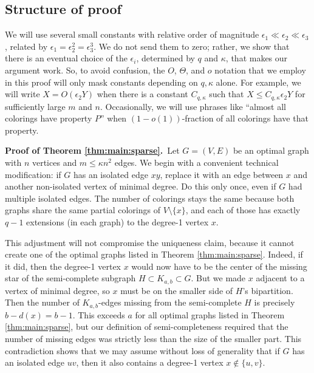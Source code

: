 \documentclass[11pt]{article}
\begin{document}
\subsection{Structure of proof}

We will use several small constants with relative order of magnitude
$\epsilon_1 \ll \epsilon_2 \ll \epsilon_3$, related by $\epsilon_1 =
\epsilon_2^2 = \epsilon_3^3$.  We do not send them to zero; rather, we
show that there is an eventual choice of the $\epsilon_i$, determined
by $q$ and $\kappa$, that makes our argument work.  So, to avoid
confusion, the $O$, $\Theta$, and $o$ notation that we employ in this
proof will only mask constants depending on $q,\kappa$ alone.  For
example, we will write $X = O(\epsilon_2 Y)$ when there is a constant
$C_{q,\kappa}$ such that $X \leq C_{q,\kappa} \epsilon_2 Y$ for
sufficiently large $m$ and $n$.  Occasionally, we will use phrases
like ``almost all colorings have property $P$'' when
$(1-o(1))$-fraction of all colorings have that property.


\vspace{3mm}


\noindent \textbf{Proof of Theorem \ref{thm:main:sparse}.}\, Let $G =
(V, E)$ be an optimal graph with $n$ vertices and $m \leq \kappa n^2$
edges.  We begin with a convenient technical modification: if $G$ has
an isolated edge $xy$, replace it with an edge between $x$ and another
non-isolated vertex of minimal degree.  Do this only once, even if $G$
had multiple isolated edges.  The number of colorings stays the same
because both graphs share the same partial colorings of $V \setminus
\{x\}$, and each of those has exactly $q-1$ extensions (in each graph)
to the degree-1 vertex $x$.

This adjustment will not compromise the uniqueness claim, because it
cannot create one of the optimal graphs listed in Theorem
\ref{thm:main:sparse}.  Indeed, if it did, then the degree-1 vertex
$x$ would now have to be the center of the missing star of the
semi-complete subgraph $H \subset K_{a,b} \subset G$.  But we made $x$
adjacent to a vertex of minimal degree, so $x$ must be on the smaller
side of $H$'s bipartition.  Then the number of $K_{a,b}$-edges missing
from the semi-complete $H$ is precisely $b-d(x) = b-1$.  This exceeds
$a$ for all optimal graphs listed in Theorem \ref{thm:main:sparse},
but our definition of semi-completeness required that the number of
missing edges was strictly less than the size of the smaller part.
This contradiction shows that we may assume without loss of generality
that if $G$ has an isolated edge $uv$, then it also contains a
degree-1 vertex $x \not \in \{u, v\}$.
\end{document}

